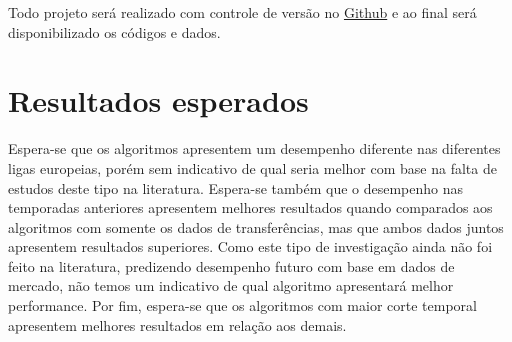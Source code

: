 \documentclass[a4paper]{article}
\theoremstyle{plain}
\theoremstyle{definition}
\begin{document}
Todo projeto será realizado com controle de versão no \href{https://github.com/}{Github} e ao final será disponibilizado os códigos e dados.

\section{Resultados esperados}

Espera-se que os algoritmos apresentem um desempenho diferente nas diferentes ligas europeias, porém sem indicativo de qual seria melhor com base na falta de estudos deste tipo na literatura. Espera-se também que o desempenho nas temporadas anteriores apresentem melhores resultados quando comparados aos algoritmos com somente os dados de transferências, mas que ambos dados juntos apresentem resultados superiores. Como este tipo de investigação ainda não foi feito na literatura, predizendo desempenho futuro com base em dados de mercado, não temos um indicativo de qual algoritmo apresentará melhor performance. Por fim, espera-se que os algoritmos com maior corte temporal apresentem melhores resultados em relação aos demais. 








%
%
\end{document}
